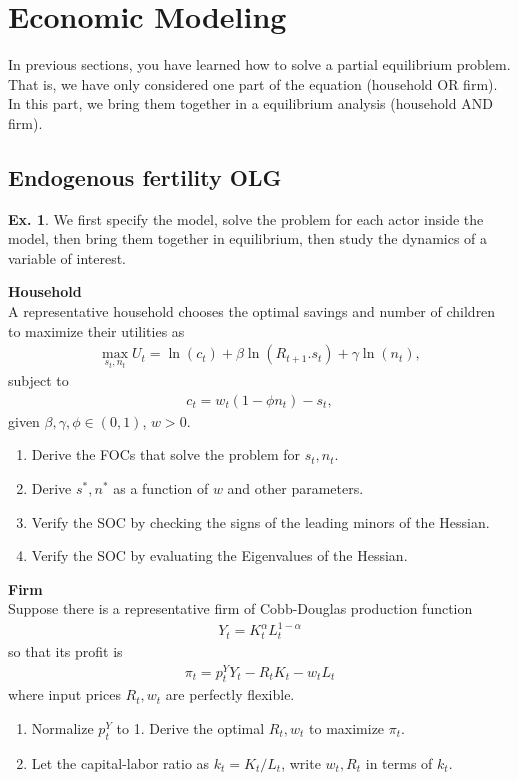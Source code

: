 \documentclass[11pt,a4paper]{book}
\theoremstyle{definition}\newtheorem{definition}{Definition}
\theoremstyle{definition}\newtheorem{fact}{Fact}
\theoremstyle{definition}\newtheorem{remark}{Remark}
\theoremstyle{definition}\newtheorem{ex}{Ex.}
\theoremstyle{definition}\newtheorem{project}{Project}
\theoremstyle{definition}\newtheorem{problem}{Problem}
\theoremstyle{definition}\newtheorem{example}{Example}
\numberwithin{theorem}{section}
\numberwithin{corollary}{chapter}
\numberwithin{assumption}{chapter}
\numberwithin{definition}{chapter}
\numberwithin{prop}{chapter}
\numberwithin{notation}{chapter}
\numberwithin{problem}{chapter}
\numberwithin{example}{chapter}
\numberwithin{fact}{chapter}
\numberwithin{ex}{chapter}
\begin{document}
	
	\newpage	
	\section{Economic Modeling}
	In previous sections, you have learned how to solve a partial equilibrium problem. That is, we have only considered one part of the equation (household OR firm). In this part, we bring them together in a equilibrium analysis (household AND firm).
	
	\subsection{Endogenous fertility OLG}
		\begin{ex} \label{ex:util1} We first specify the model, solve the problem for each actor inside the model, then bring them together in equilibrium, then study the dynamics of a variable of interest.
	
		\textbf{Household} \\
		A representative household chooses the optimal savings and number of children to maximize their utilities as
		\begin{align*}
			\max_{s_t, n_t} U_t = \ln(c_t) + \beta\ln(R_{t+1} . s_t) + \gamma \ln(n_t),
		\end{align*}
		subject to
		\begin{align*}
			c_t = w_t (1-\phi n_t) - s_t,
		\end{align*}
		given $\beta,\gamma,\phi \in (0,1)$, $w > 0$. 
		\begin{enumerate}
			\item Derive the FOCs that solve the problem for $s_t, n_t$.
			\item Derive $s^*, n^*$ as a function of $w$ and other parameters.
			\item Verify the SOC by checking the signs of the leading minors of the Hessian.
			\item Verify the SOC by evaluating the Eigenvalues of the Hessian.
		\end{enumerate}
		
		\textbf{Firm} \\
		Suppose there is a representative firm of Cobb-Douglas production function
		\begin{align*}
			Y_t = K_t^\alpha L_t^{1-\alpha}
		\end{align*}
		so that its profit is
		\begin{align*}
			\pi_t = p^Y_t Y_t - R_t K_t - w_t L_t
		\end{align*}
		where input prices $R_t, w_t$ are perfectly flexible.
		\begin{enumerate}
			\item Normalize $p^Y_t$ to 1. Derive the optimal $R_t, w_t$ to maximize $\pi_t$.
			\item Let the capital-labor ratio as $k_t = K_t/L_t$, write $w_t, R_t$ in terms of $k_t$.
		\end{enumerate}
		

\end{ex}
\end{document}
